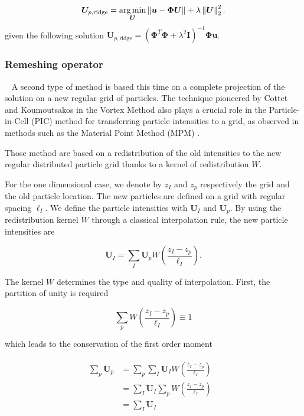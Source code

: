 \begin{equation*}
	\bm{U}_{p,\text{ridge}} = \operatorname*{arg\,min}_{\bm{U}} \left\lVert \bm{u} - \bm \Phi \bm{U} \right\rVert + \lambda \left\lVert \bm{U} \right\rVert^2_2.
\end{equation*}given the following solution $\bm{U}_{p,\text{ridge}} = (\bm \Phi^T \bm \Phi + \lambda^2 \bm I)^{-1} \bm \Phi \bm{u}$.


\subsubsection{Remeshing operator}~\label{remesh_part}
A second type of method is based this time on a complete projection of the solution on a new regular grid of particles.
The technique pioneered by Cottet and Koumoutsakos \cite{cottet_vortex_2000,cottet_multi-purpose_1999} in the Vortex Method also plays a crucial role in the Particle-in-Cell (PIC) method for transferring particle intensities to a grid, as observed in methods such as the Material Point Method (MPM) \cite{sulsky_particle_1994,de_vaucorbeil_material_2020,jiang_affine_2015}.

Those method are based on a redistribution of the old intensities to the new regular distributed particle grid thanks to a kernel of redistribution $W$.

For the one dimensional case, we denote by $z_{I}$ and $z_{p}$ respectively the grid and the old particle location. The new particles are defined on a grid with regular spacing $\ell_I$. We define the particle intensities with $\bm U_I$ and $\bm U_p$. By using the redistribution kernel $W$ through a classical interpolation rule, the new particle intensities are

\begin{equation*}
	\bm U_I = \sum_I \bm U_p  W \left(\frac{z_I - z_p}{\ell_I} \right).
\end{equation*}

The kernel $W$ determines the type and quality of interpolation. First, the partition of unity is required

\begin{equation*}
	\sum_p W\left(\frac{z_I - z_p}{\ell_I}\right) \equiv 1
\end{equation*}

which leads to the conservation of the first order moment

\begin{gather}
	\begin{align*}
		\sum_p \bm U_p & = \sum_p\sum_I \bm U_I  W \left(\frac{z_I -  z_p}{\ell_I} \right)    & \\
		               & = \sum_I \bm U_I  \sum_p W \left(\frac{  z_I -   z_p}{\ell_I}\right) & \\
		               & = \sum_I \bm U_I
	\end{align*}
\end{gather}


